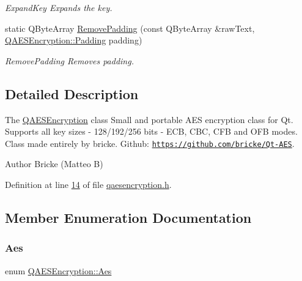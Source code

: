 \begin{DoxyCompactItemize}
\begin{DoxyCompactList}\small\item\em Expand\+Key Expands the key. \end{DoxyCompactList}\item 
static Q\+Byte\+Array \mbox{\hyperlink{class_q_a_e_s_encryption_abb2887bf5623a74053dd19627f3d3055}{Remove\+Padding}} (const Q\+Byte\+Array \&raw\+Text, \mbox{\hyperlink{class_q_a_e_s_encryption_ab0a65cdea4eac21ef32530010d1b0247}{Q\+A\+E\+S\+Encryption\+::\+Padding}} padding)
\begin{DoxyCompactList}\small\item\em Remove\+Padding Removes padding. \end{DoxyCompactList}\end{DoxyCompactItemize}


\subsection{Detailed Description}
The \mbox{\hyperlink{class_q_a_e_s_encryption}{Q\+A\+E\+S\+Encryption}} class Small and portable A\+ES encryption class for Qt. Supports all key sizes -\/ 128/192/256 bits -\/ E\+CB, C\+BC, C\+FB and O\+FB modes. Class made entirely by bricke. Github\+: \href{https://github.com/bricke/Qt-AES}{\tt https\+://github.\+com/bricke/\+Qt-\/\+A\+ES}. 

\begin{DoxyAuthor}{Author}
Bricke (Matteo B) 
\end{DoxyAuthor}


Definition at line \mbox{\hyperlink{qaesencryption_8h_source_l00014}{14}} of file \mbox{\hyperlink{qaesencryption_8h_source}{qaesencryption.\+h}}.



\subsection{Member Enumeration Documentation}
\mbox{\label{class_q_a_e_s_encryption_abe48208f4f6c7d68e6a10b49b9d0b7bd}} 
\subsubsection{\texorpdfstring{Aes}{Aes}}
{\footnotesize\ttfamily enum \mbox{\hyperlink{class_q_a_e_s_encryption_abe48208f4f6c7d68e6a10b49b9d0b7bd}{Q\+A\+E\+S\+Encryption\+::\+Aes}}}



